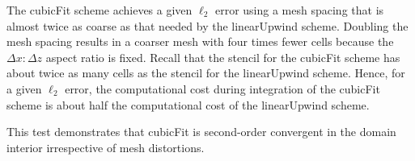 The cubicFit scheme achieves a given $\ell_2$ error using a mesh spacing that is almost twice as coarse as that needed by the linearUpwind scheme.  Doubling the mesh spacing results in a coarser mesh with four times fewer cells because the $\Delta x \mathbin{:} \Delta z$ aspect ratio is fixed.
Recall that the stencil for the cubicFit scheme has about twice as many cells as the stencil for the linearUpwind scheme.
Hence, for a given $\ell_2$ error, the computational cost during integration of the cubicFit scheme is about half the computational cost of the linearUpwind scheme.

This test demonstrates that cubicFit is second-order convergent in the domain interior irrespective of mesh distortions.  
